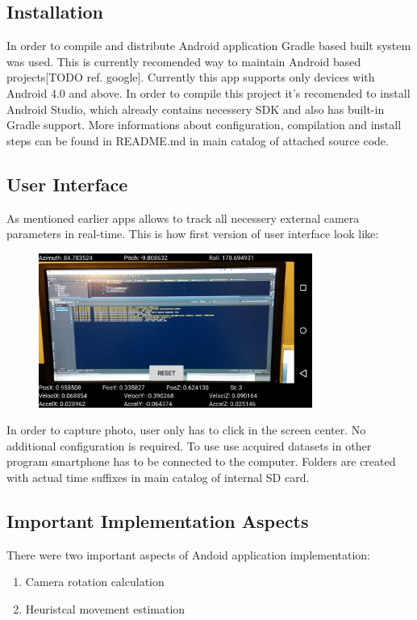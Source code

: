 \subsection{Installation}
In order to compile and distribute Android application Gradle based built system was used. This is currently recomended way to maintain Android based projects[TODO ref. google]. Currently this app supports only devices with Android 4.0 and above. In order to compile this project it's recomended to install Android Studio, which already contains necessery SDK and also has built-in Gradle support. More informations about configuration, compilation and install steps can be found in README.md in main catalog of attached source code. 
\subsection{User Interface}
As mentioned earlier apps allows to track all necessery external camera parameters in real-time. This is how first version of user interface look like:
\begin{figure}[h!]
    \centering
    \includegraphics[width=0.8\textwidth]{AndroidScreenShot}
    \caption{}
    \label{fig:AndroidScreenShot}
\end{figure}
\clearpage
In order to capture photo, user only has to click in the screen center. No additional configuration is required. To use use acquired datasets in other program smartphone has to be connected to the computer. Folders are created with actual time suffixes in main catalog of internal SD card.
\subsection{Important Implementation Aspects}
There were two important aspects of Andoid application implementation:
\begin{enumerate}
\item Camera rotation calculation
\item Heuristcal movement estimation
\end{enumerate}
